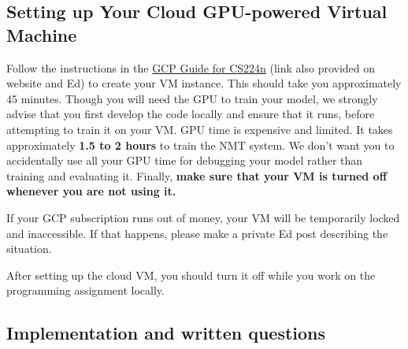 \subsection*{Setting up Your Cloud GPU-powered Virtual Machine}
Follow the instructions in the \href{https://docs.google.com/document/d/1FLx0CXIn-SoExxKM1efC-E-6iBjUR4uEnpGnfemMMR0/edit?pli=1#heading=h.4tqnggp12z76}{GCP Guide for CS224n}
(link also provided on website and Ed) to create your VM instance. This should take you approximately 45 minutes. Though you will need the GPU to train your model, we strongly advise that you first develop the code locally and ensure that it runs, before attempting to train it on your VM. GPU time is expensive and limited. It takes approximately \textbf{1.5 to 2 hours} to train the NMT system. We don't want you to accidentally use all your GPU time for debugging your model rather than training and evaluating it. Finally, \textbf{make sure that your VM is turned off whenever you are not using it.}

If your GCP subscription runs out of money, your VM will be temporarily locked and inaccessible. If that happens, please make a private Ed post describing the situation.


After setting up the cloud VM, you should turn it off while you work on the programming assignment locally.

\subsection*{Implementation and written questions}

